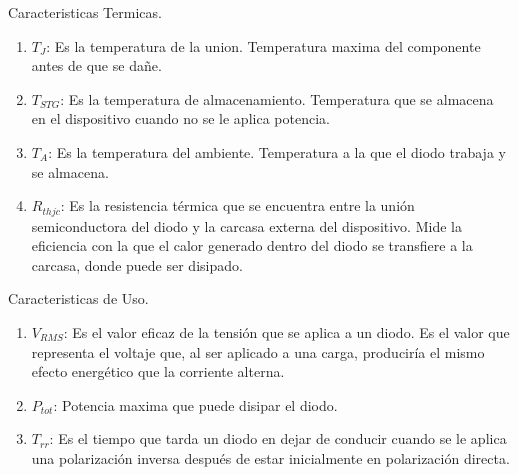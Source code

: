 \documentclass[chaptersright]{informeutn}
\begin{document}
        Caracteristicas Termicas.

        \begin{enumerate}
            \item $T_J$: Es la temperatura de la union. Temperatura maxima del componente antes de que se dañe.\\
            \item $T_{STG}$: Es la temperatura de almacenamiento. Temperatura que se almacena en el dispositivo cuando
              no se le aplica potencia.\\
            \item $T_A$: Es la temperatura del ambiente. Temperatura a la que el diodo trabaja y se almacena.\\
            \item $R_{thjc}$: Es la resistencia térmica que se encuentra entre la unión semiconductora del diodo y la
              carcasa externa del dispositivo. Mide la eficiencia con la que el calor generado dentro del diodo se
              transfiere a la carcasa, donde puede ser disipado.
        \end{enumerate}


        Caracteristicas de Uso.

        \begin{enumerate}
          \item $V_{RMS}$: Es el valor eficaz de la tensión que se aplica a un diodo. Es el valor que representa el
            voltaje que, al ser aplicado a una carga, produciría el mismo efecto energético que la corriente alterna.\\
          \item $P_{tot}$: Potencia maxima que puede disipar el diodo.\\
          \item $T_{rr}$: Es el tiempo que tarda un diodo en dejar de conducir cuando se le aplica una polarización
            inversa después de estar inicialmente en polarización directa.
        \end{enumerate}

  \printbibliography
\end{document}
